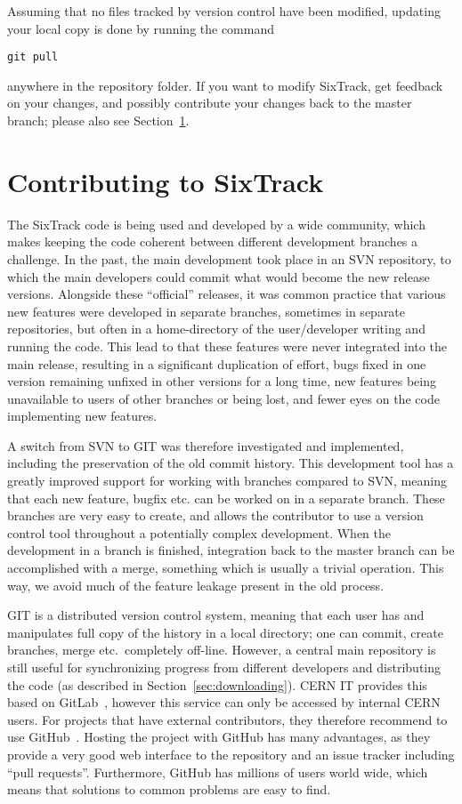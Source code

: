 \documentclass[english,BCOR=0mm,DIV=18]{scrartcl}
\begin{document}
Assuming that no files tracked by version control have been modified, updating your local copy is done by running the command
\begin{lstlisting}
git pull
\end{lstlisting}
anywhere in the repository folder.
If you want to modify SixTrack, get feedback on your changes, and possibly contribute your changes back to the master branch; please also see Section~\ref{sec:contributing}.

\section{Contributing to SixTrack}
\label{sec:contributing}

The SixTrack code is being used and developed by a wide community, which makes keeping the code coherent between different development branches a challenge.
In the past, the main development took place in an SVN repository, to which the main developers could commit what would become the new release versions.
Alongside these ``official'' releases, it was common practice that various new features were developed in separate branches, sometimes in separate repositories, but often in a home-directory of the user/developer writing and running the code.
This lead to that these features were never integrated into the main release, resulting in a significant duplication of effort, bugs fixed in one version remaining unfixed in other versions for a long time, new features being unavailable to users of other branches or being lost, and fewer eyes on the code implementing new features.

A switch from SVN to GIT was therefore investigated and implemented, including the preservation of the old commit history.
This development tool has a greatly improved support for working with branches compared to SVN, meaning that each new feature, bugfix etc. can be worked on in a separate branch.
These branches are very easy to create, and allows the contributor to use a version control tool throughout a potentially complex development.
When the development in a branch is finished, integration back to the master branch can be accomplished with a merge, something which is usually a trivial operation.
This way, we avoid much of the feature leakage present in the old process.

GIT is a distributed version control system, meaning that each user has and manipulates full copy of the history in a local directory; one can commit, create branches, merge etc.\ completely off-line.
However, a central main repository is still useful for synchronizing progress from different developers and distributing the code (as described in Section~\ref{sec:downloading}).
CERN IT provides this based on GitLab~\cite{CERNgitlab}, however this service can only be accessed by internal CERN users.
For projects that have external contributors, they therefore recommend to use GitHub~\cite{CERNgitProviders}.
Hosting the project with GitHub has many advantages, as they provide a very good web interface to the repository and an issue tracker including ``pull requests''.
Furthermore, GitHub has millions of users world wide, which means that solutions to common problems are easy to find.
\end{document}
